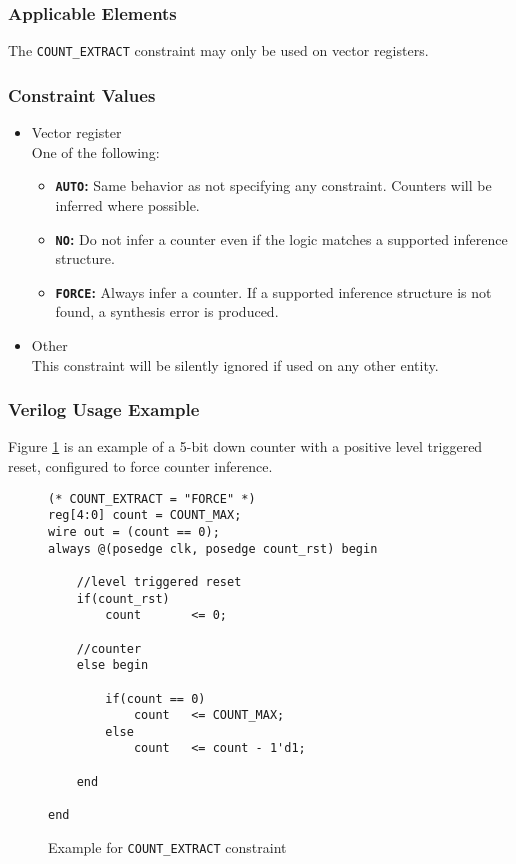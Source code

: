 \documentclass[11pt]{article}
\newcommand{\tokenstyle}[1]{\texttt{#1}}
\newcommand{\valuestyle}[1]{\texttt{#1}}
\newcommand{\strvaluestyle}[1]{\valuestyle{\textquotedbl#1\textquotedbl}}
\newcommand{\strexamplestyle}[1]{\textbf{\strvaluestyle{#1}:}}
\newcommand{\whenstyle}[1]{{\fontseries{sb}\selectfont#1}}
\begin{document}
\subsubsection{Applicable Elements}
The \tokenstyle{COUNT\_EXTRACT} constraint may only be used on vector registers.

\subsubsection{Constraint Values}
\begin{itemize}
\item \whenstyle{Vector register}\\
One of the following:
\begin{itemize}
\item \strexamplestyle{AUTO} Same behavior as not specifying any constraint. Counters will be inferred where possible.
\item \strexamplestyle{NO} Do not infer a counter even if the logic matches a supported inference structure.
\item \strexamplestyle{FORCE} Always infer a counter. If a supported inference structure is not found, a synthesis error is produced.
\end{itemize}
\item \whenstyle{Other} \\
This constraint will be silently ignored if used on any other entity.
\end{itemize}

\subsubsection{Verilog Usage Example}

Figure \ref{constraint-count-extract} is an example of a 5-bit down counter with a positive level triggered reset,
configured to force counter inference.

\begin{figure}[h]
\begin{lstlisting}
(* COUNT_EXTRACT = "FORCE" *)
reg[4:0] count = COUNT_MAX;
wire out = (count == 0);
always @(posedge clk, posedge count_rst) begin

	//level triggered reset
	if(count_rst)
		count		<= 0;

	//counter
	else begin

		if(count == 0)
			count	<= COUNT_MAX;
		else
			count	<= count - 1'd1;

	end

end
\end{lstlisting}
\caption{Example for \tokenstyle{COUNT\_EXTRACT} constraint}
\label{constraint-count-extract}
\end{figure}
\end{document}
